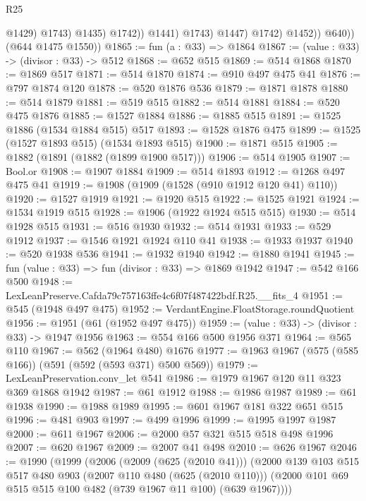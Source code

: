 \begin{lexlean}{R25}
\begin{coremodule}
                                @1429)
                              @1743)
                            @1435)
                          @1742))
                      @1441)
                    @1743)
                  @1447)
                @1742)
              @1452))
          @640))
      (@644 @1475 @1550))
@1865 := fun (a : @33) => @1864
@1867 := (value : @33) -> (divisor : @33) -> @512
@1868 := @652 @515
@1869 := @514 @1868
@1870 := @1869 @517
@1871 := @514 @1870
@1874 := @910 @497 @475 @41
@1876 := @797 @1874 @120
@1878 := @520 @1876 @536
@1879 := @1871 @1878
@1880 := @514 @1879
@1881 := @519 @515
@1882 := @514 @1881
@1884 := @520 @475 @1876
@1885 := @1527 @1884
@1886 := @1885 @515
@1891 := @1525 @1886 (@1534 @1884 @515) @517
@1893 := @1528 @1876 @475
@1899 := @1525 (@1527 @1893 @515) (@1534 @1893 @515)
@1900 := @1871 @515
@1905 := @1882 (@1891 (@1882 (@1899 @1900 @517)))
@1906 := @514 @1905
@1907 := Bool.or
@1908 := @1907 @1884
@1909 := @514 @1893
@1912 := @1268 @497 @475 @41
@1919 := @1908 (@1909 (@1528 (@910 @1912 @120 @41) @110))
@1920 := @1527 @1919
@1921 := @1920 @515
@1922 := @1525 @1921
@1924 := @1534 @1919 @515
@1928 := @1906 (@1922 @1924 @515 @515)
@1930 := @514 @1928 @515
@1931 := @516 @1930
@1932 := @514 @1931
@1933 := @529 @1912
@1937 := @1546 @1921 @1924 @110 @41
@1938 := @1933 @1937
@1940 := @520 @1938 @536
@1941 := @1932 @1940
@1942 := @1880 @1941
@1945 := fun (value : @33) => fun (divisor : @33) => @1869 @1942
@1947 := @542 @166 @500
@1948 := LexLeanPreserve.Cafda79c757163ffe4c6f07f487422bdf.R25.__fits_4
@1951 := @545 (@1948 @497 @475)
@1952 := VerdantEngine.FloatStorage.roundQuotient
@1956 := @1951 (@61 (@1952 @497 @475))
@1959 := (value : @33) -> (divisor : @33) -> @1947 @1956
@1963 := @554 @166 @500 @1956 @371
@1964 := @565 @110
@1967 := @562 (@1964 @480) @1676
@1977 := @1963 @1967 (@575 (@585 @166)) (@591 (@592 (@593 @371) @500 @569))
@1979 := LexLeanPreservation.conv_let @541
@1986 := @1979 @1967 @120 @11 @323 @369 @1868 @1942
@1987 := @61 @1912
@1988 := @1986 @1987
@1989 := @61 @1938
@1990 := @1988 @1989
@1995 := @601 @1967 @181 @322 @651 @515
@1996 := @481 @903
@1997 := @499 @1996
@1999 := @1995 @1997 @1987
@2000 := @611 @1967
@2006 := @2000 @57 @321 @515 @518 @498 @1996
@2007 := @620 @1967
@2009 := @2007 @41 @498
@2010 := @626 @1967
@2046 := @1990
    (@1999
      (@2006
        (@2009 (@625 (@2010 @41)))
        (@2000
          @139
          @103
          @515
          @517
          @480
          @903
          (@2007 @110 @480 (@625 (@2010 @110)))
          (@2000 @101 @69 @515 @515 @100 @482 (@739 @1967 @11 @100) (@639 @1967))))

\end{coremodule}
\end{lexlean}
